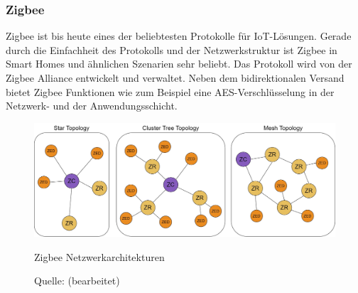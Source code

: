 \subsubsection{Zigbee}
\label{sec:ThHi:Zigbee}

Zigbee ist bis heute eines der beliebtesten Protokolle für IoT-Lösungen. Gerade durch die Einfachheit des Protokolls und der Netzwerkstruktur ist Zigbee in Smart Homes und ähnlichen Szenarien sehr beliebt. Das Protokoll wird von der Zigbee Alliance entwickelt und verwaltet. Neben dem bidirektionalen Versand bietet Zigbee Funktionen wie zum Beispiel eine AES-Verschlüsselung in der Netzwerk- und der Anwendungsschicht. 

\begin{figure}[H]
  \vspace{10pt}
  \begin{center}
    \includegraphics[width=1.0\textwidth]{./images/zigbee-arch.jpg}
  \end{center}
  \vspace{-5pt}
  \caption[Zigbee Netzwerkarchitekturen]{Zigbee Netzwerkarchitekturen}
  \caption*{Quelle: {\cite{IoTAndEdge.2020} (bearbeitet)}}
  \label{fig:zigbee-arch}
  \vspace{-10pt}
\end{figure}


